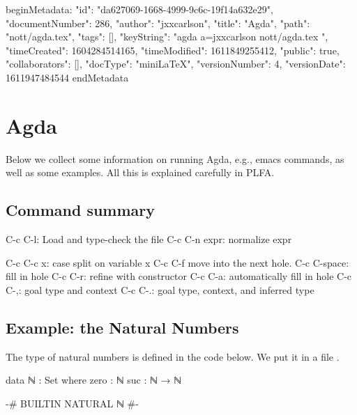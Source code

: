 beginMetadata:
{
    "id": "da627069-1668-4999-9c6c-19f14a632e29",
    "documentNumber": 286,
    "author": "jxxcarlson",
    "title": "Agda",
    "path": "nott/agda.tex",
    "tags": [],
    "keyString": "agda a=jxxcarlson nott/agda.tex ",
    "timeCreated": 1604284514165,
    "timeModified": 1611849255412,
    "public": true,
    "collaborators": [],
    "docType": "miniLaTeX",
    "versionNumber": 4,
    "versionDate": 1611947484544
}
endMetadata



\setcounter{section}{3}

\section{Agda}

\innertableofcontents



Below we collect some information on running Agda, e.g., emacs commands, as well as some examples.  All this is explained carefully in PLFA.

\subsection{Command summary}

\begin{colored}[bash]
C-c C-l: Load and type-check the file
C-c C-n expr: normalize expr

C-c C-c x: case split on variable x
C-c C-f move into the next hole.
C-c C-space: fill in hole
C-c C-r: refine with constructor
C-c C-a: automatically fill in hole
C-c C-,: goal type and context
C-c C-.: goal type, context, and inferred type
\end{colored}


\subsection{Example: the Natural Numbers}

The type of natural numbers is defined in the code below.  We put it in a file .

\begin{colored}[elm]
data ℕ : Set where
    zero : ℕ
    suc  : ℕ → ℕ
  
{-# BUILTIN NATURAL ℕ #-}
\end{colored}

